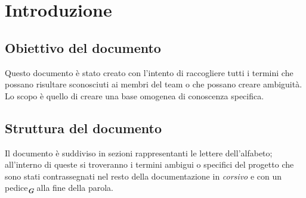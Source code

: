 


\section{Introduzione}

\subsection{Obiettivo del documento}
Questo documento è stato creato con l’intento di raccogliere tutti i termini che possano risultare sconosciuti ai membri del team o che possano creare 
ambiguità. Lo scopo è quello di creare una base omogenea di conoscenza specifica.

\subsection{Struttura del documento}
Il documento è suddiviso in sezioni rappresentanti le lettere dell’alfabeto; all’interno di queste si troveranno i termini ambigui o specifici del progetto 
che sono stati contrassegnati nel resto della documentazione in \emph{corsivo} e con un pedice\textsubscript{\textit{\textbf{G}}} alla fine della parola.
